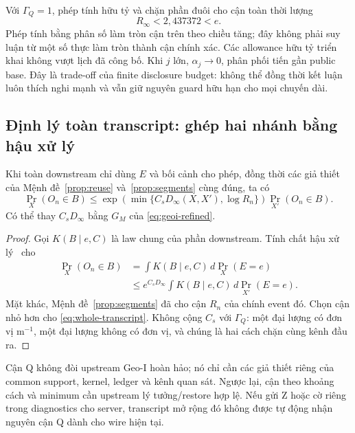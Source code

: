 Với $\Gamma_Q=1$, phép tính hữu tỷ và chặn phần đuôi cho cận toàn thời lượng
\begin{equation}
R_\infty<2{,}437372<e.
\label{eq:r-infinite}
\end{equation}
Phép tính bằng phân số làm tròn cận trên theo chiều tăng; đây không phải suy luận từ một số thực làm tròn
thành cận chính xác. Các allowance hữu tỷ triển khai không vượt lịch đã công bố. Khi $j$ lớn,
$\alpha_j\to0$, phân phối tiến gần public base. Đây là trade-off của finite disclosure budget:
không thể đồng thời kết luận luôn thích nghi mạnh và vẫn giữ nguyên guard hữu hạn cho mọi chuyến dài.

\subsection{Định lý toàn transcript: ghép hai nhánh bằng hậu xử lý}
\begin{theorem}\label{thm:transcript}
Khi toàn downstream chỉ dùng $E$ và bối cảnh cho phép, đồng thời các giả thiết của
Mệnh đề~\ref{prop:reuse} và~\ref{prop:segments} cùng đúng, ta có
\begin{equation}
\Pr_X(O_n\in B)\le
\exp\!\left(\min\{C_sD_\infty(X,X'),\log R_n\}\right)\Pr_{X'}(O_n\in B).
\label{eq:whole-transcript}
\end{equation}
Có thể thay $C_sD_\infty$ bằng $G_M$ của \eqref{eq:geoi-refined}.
\end{theorem}
\begin{proof}
Gọi $K(B\mid e,C)$ là law chung của phần downstream. Tính chất hậu xử lý~\cite{dworkroth} cho
\begin{align}
\Pr_X(O_n\in B)&=\int K(B\mid e,C)\,d\Pr_X(E=e)\nonumber\\
&\le e^{C_sD_\infty}\int K(B\mid e,C)\,d\Pr_{X'}(E=e).
\label{eq:integral-postprocess}
\end{align}
Mặt khác, Mệnh đề~\ref{prop:segments} đã cho cận $R_n$ của chính event đó. Chọn cận nhỏ hơn cho
\eqref{eq:whole-transcript}. Không cộng $C_s$ với $\Gamma_Q$: một đại lượng có đơn vị m$^{-1}$,
một đại lượng không có đơn vị, và chúng là hai cách chặn cùng kênh đầu ra.
\end{proof}

Cận Q không đòi upstream Geo-I hoàn hảo; nó chỉ cần các giả thiết riêng của common support, kernel,
ledger và kênh quan sát. Ngược lại, cận theo khoảng cách và minimum cần upstream lý tưởng/restore
hợp lệ. Nếu gửi Z hoặc cờ riêng trong diagnostics cho server, transcript mở rộng đó không được tự
động nhận nguyên cận Q dành cho wire hiện tại.

